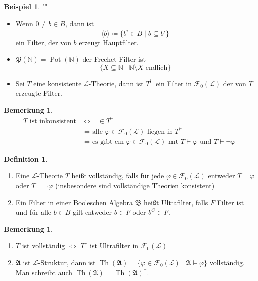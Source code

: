 \documentclass[12pt,parskip=full]{scrartcl}
\newcommand{\setN}{\mathbb{N}}
\theoremstyle{definition}
\newtheorem{definition}[theorem]{Definition}
\newtheorem{example}[theorem]{Beispiel}
\newtheorem{remark}[theorem]{Bemerkung}
\begin{document}
	\begin{example}""
		\begin{itemize}
			\item Wenn $0 \neq b \in B$, dann ist
			\begin{equation*}
				\langle b \rangle \coloneqq \{ b^i \in B \mid b \subseteq b' \}
			\end{equation*}
			ein Filter, der von $b$ erzeugt Hauptfilter.
			\item $\mathfrak{P}(\setN) = \operatorname{Pot}(\setN)$ der Frechet-Filter ist
			\begin{equation*}
				\{ X \subseteq \setN \mid \setN \setminus X \text{ endlich} \}
			\end{equation*}
			\item Sei $T$ eine konsistente $\mathcal{L}$-Theorie, dann ist $T^\vdash$ ein Filter in $\mathcal{F}_0(\mathcal{L})$ der von $T$ erzeugte Filter.
		\end{itemize}
	\end{example}

	\begin{remark}
		\begin{align*}
			\text{$T$ ist inkonsistent} &\Longleftrightarrow \bot \in T^\vdash \\
			&\Longleftrightarrow \text{alle $\varphi \in \mathcal{F}_0(\mathcal{L})$ liegen in $T^\vdash$} \\
			&\Longleftrightarrow \text{es gibt ein $\varphi \in \mathcal{F}_0(\mathcal{L})$ mit $T \vdash \varphi$ und $T \vdash \lnot \varphi$}
		\end{align*}
	\end{remark}

	\begin{definition}
		\begin{enumerate}
			\item Eine $\mathcal{L}$-Theorie $T$ heißt vollständig, falls für jede $\varphi \in \mathcal{F}_0(\mathcal{L})$ entweder $T \vdash \varphi$ oder $T \vdash \lnot \varphi$ (insbesondere sind vollständige Theorien konsistent)
			\item Ein Filter in einer Booleschen Algebra $\mathfrak{B}$ heißt Ultrafilter, falls $F$ Filter ist und für alle $b \in B$ gilt entweder $b \in F$ oder $b^C \in F$.
		\end{enumerate}
	\end{definition}

	\begin{remark}
		\begin{enumerate}
			\item $T$ ist vollständig $\Leftrightarrow$ $T^\vdash$ ist Ultrafilter in $\mathcal{F}_0(\mathcal{L})$
			\item $\mathfrak{A}$ ist $\mathcal{L}$-Struktur, dann ist $\operatorname{Th}(\mathfrak{A}) = \{ \varphi \in \mathcal{F}_0(\mathcal{L}) \mid \mathfrak{A} \models \varphi \}$ vollständig. Man schreibt auch $\operatorname{Th}(\mathfrak{A}) = \operatorname{Th}(\mathfrak{A})^\vdash$.
		\end{enumerate}
	\end{remark}
\end{document}

